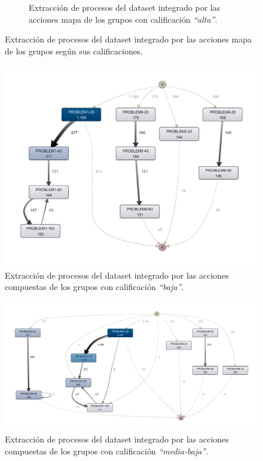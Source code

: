 \begin{figure}[H]
\begin{subfigure}[t]{0.60\textwidth}
    \caption{Extracción de procesos del dataset integrado por las acciones mapa de los grupos con calificación \emph{``alta''}.}
    \label{fig:mapHighGrades}
  \end{subfigure}
  \caption{Extracción de procesos del dataset integrado por las acciones mapa de los grupos según sus calificaciones.}
\end{figure}

\begin{figure}[H]
    \centering
    \includegraphics[width=1.25\textwidth]{imagenes/DISCO_compound/WorstGrades.png}
    \caption{Extracción de procesos del dataset integrado por las acciones compuestas de los grupos con calificación \emph{``baja''}.}
    \label{fig:worstGrades}
\end{figure}

\begin{figure}[H]
    \centering
    \includegraphics[width=1.25\textwidth]{imagenes/DISCO_compound/MidLowGrades.png}
    \caption{Extracción de procesos del dataset integrado por las acciones compuestas de los grupos con calificación \emph{``media-baja''}.}
    \label{fig:midLowGrades}
\end{figure}

